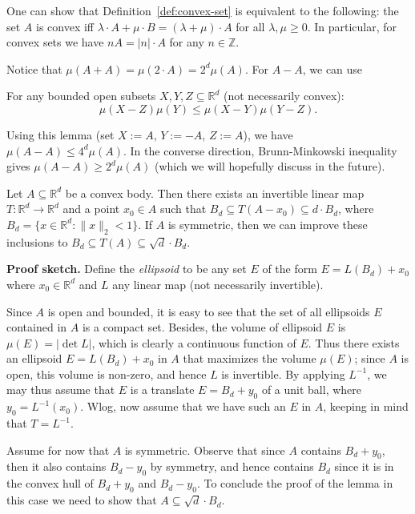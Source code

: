 \documentclass{template-2}
\begin{document}
\begin{remark}
    One can show that Definition~\ref{def:convex-set} is equivalent to the
    following: the set $A$ is convex iff $\lambda \cdot A + \mu \cdot B =
    (\lambda+\mu)\cdot A$ for all $\lambda,\mu \geq 0$. In particular, for
    convex sets we have $nA = |n|\cdot A$ for any $n \in \mathbb{Z}$.
\end{remark}

Notice that $\mu(A+A)=\mu(2 \cdot A)=2^d\mu(A)$. For $A-A$, we can use
\begin{lemma}
    For any bounded open subsets $X,Y,Z \subseteq \mathbb{R}^d$ (not necessarily 
    convex):
    \begin{equation*}
        \mu(X-Z)\mu(Y) \leq \mu(X-Y)\mu(Y-Z).
    \end{equation*}
\end{lemma}

Using this lemma (set $X:=A$, $Y:=-A$, $Z:=A$), we have $\mu(A-A) \leq
4^d\mu(A)$. In the converse direction, Brunn-Minkowski inequality gives
$\mu(A-A) \geq 2^d\mu(A)$ (which we will hopefully discuss in the future).

\begin{theorem}
    Let $A \subseteq \mathbb{R}^d$ be a convex body. Then there exists an
    invertible linear map $T: \mathbb{R}^d \to \mathbb{R}^d$ and a point $x_0
    \in A$ such that $B_d \subseteq T(A-x_0) \subseteq d \cdot B_d$, where $B_d
    = \{x \in \mathbb{R}^d: \|x\|_2 < 1\}$. If $A$ is symmetric, then we can
    improve these inclusions to $B_d \subseteq T(A) \subseteq \sqrt{d} \cdot
    B_d$.
\end{theorem}

\textbf{Proof sketch.} Define the \textit{ellipsoid} to be any set $E$ of the form
$E=L(B_d)+x_0$ where $x_0 \in \mathbb{R}^d$ and $L$ any linear map (not
necessarily invertible). 

Since $A$ is open and bounded, it is easy to see that the set of all ellipsoids
$E$ contained in $A$ is a compact set. Besides, the volume of ellipsoid $E$ is
$\mu(E)=|\det L|$, which is clearly a continuous function of $E$. Thus there
exists an ellipsoid $E=L(B_d)+x_0$ in $A$ that maximizes the volume $\mu(E)$;
since $A$ is open, this volume is non-zero, and hence $L$ is invertible. By
applying $L^{-1}$, we may thus assume that $E$ is a translate $E=B_d+y_0$ of a
unit ball, where $y_0=L^{-1}(x_0)$. Wlog, now assume that we have such an $E$ in
$A$, keeping in mind that $T=L^{-1}$.

Assume for now that $A$ is symmetric. Observe that since $A$ contains $B_d+y_0$,
then it also contains $B_d-y_0$ by symmetry, and hence contains $B_d$ since it
is in the convex hull of $B_d+y_0$ and $B_d-y_0$. To conclude the proof of the
lemma in this case we need to show that $A \subseteq \sqrt{d} \cdot B_d$. 
\end{document}
